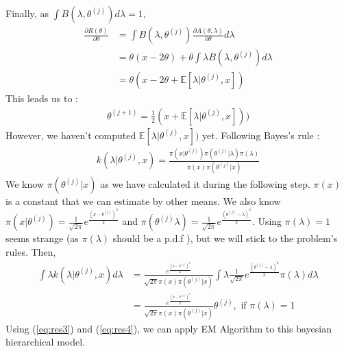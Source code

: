 \documentclass{article}
\begin{document}
Finally, as $\int B(\lambda, \theta^{(j)}) d\lambda = 1$, 
\begin{align*}
    \frac{\partial R(\theta)}{\partial \theta} &=
        \int B(\lambda, \theta^{(j)}) \frac{\partial A(\theta, \lambda)}{\partial \theta}
        d \lambda \\
        &= \theta(x-2\theta) + \theta \int \lambda B(\lambda, \theta^{(j)}) d\lambda \\
        &= \theta(x- 2\theta + \mathbb{E}[\lambda | \theta^{(j)}, x])
\end{align*}
This leads us to :
\begin{align}\label{eq:res3}
    \theta^{(j+1)} = \frac{1}{2}(x +  \mathbb{E}[\lambda | \theta^{(j)}, x])    )
\end{align}
However, we haven't computed   $\mathbb{E}[\lambda | \theta^{(j)}, x])$ yet.
Following Bayes's rule :
\begin{align*}
    k(\lambda|\theta^{(j)}, x) = \frac{\pi(x|\theta^{(j)})
                                        \pi (\theta^{(j)}|\lambda)
                                        \pi(\lambda) }
                                        {\pi(x) \pi(\theta^{(j)}|x)}
\end{align*}
We know $\pi(\theta^{(j)}|x)$ as we have calculated it during the following step. 
$\pi(x)$ is a constant that we can estimate by other means. 
We also know $\pi(x|\theta^{(j)}) = \frac{1}{\sqrt{2\pi}}e^{\frac{(x-\theta^{(j)})^2}{2}}$
and $\pi(\theta^{(j)}\lambda) = \frac{1}{\sqrt{2\pi}}e^{\frac{(\theta^{(j)}-\lambda)^2}{2}}$. Using 
$\pi(\lambda) = 1$ seems strange (as $\pi(\lambda)$ should be a p.d.f ), but we will 
stick to the problem's rules. Then, 
\begin{align}
    \int \lambda k(\lambda|\theta^{(j)}, x) d\lambda &= 
        \frac{e^{\frac{(x-\theta^{(j)})^2}{2} } }{\sqrt{2\pi} \pi(x) \pi(\theta^{(j)}|x)}
        \int \lambda 
        \frac{1}{\sqrt{2\pi}}e^{\frac{(\theta^{(j)}-\lambda)^2}{2}}
              \pi(\lambda) d\lambda \\
            &= \frac{e^{\frac{(x-\theta^{(j)})^2}{2} } }{\sqrt{2\pi} \pi(x) \pi(\theta^{(j)}|x)}
                \theta^{(j)}, \text{ if } \pi(\lambda) = 1 \label{eq:res4}
\end{align}
Using (\ref{eq:res3}) and (\ref{eq:res4}), we can apply EM Algorithm to this bayesian hierarchical model.
\end{document}
